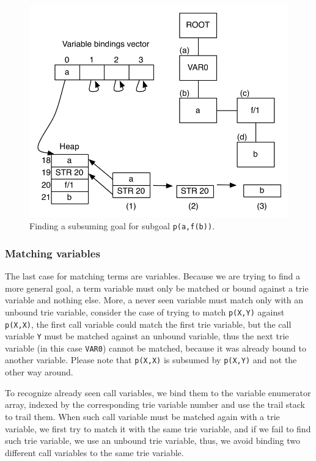 \begin{figure}[ht]
  \centering
    \includegraphics[scale=0.6]{match_functor.pdf}
  \caption{Finding a subsuming goal for subgoal \texttt{p(a,f(b))}.}
  \label{fig:match_functor}
\end{figure}

\subsubsection{Matching variables}

The last case for matching terms are variables. Because we are trying to find a more general goal,
a term variable must only be matched or bound against a trie variable and nothing else. More, a
never seen variable must match only with an unbound trie variable, consider the case of trying to
match \texttt{p(X,Y)} against \texttt{p(X,X)}, the first call variable could match the first trie variable,
but the call variable \texttt{Y} must be matched against an unbound variable, thus the next trie variable
(in this case \texttt{VAR0}) cannot be matched, because it was already bound to another variable.
Please note that \texttt{p(X,X)} is subsumed by \texttt{p(X,Y)} and not the other way around.

To recognize already seen call variables, we bind them to the variable enumerator array, indexed
by the corresponding trie variable number and use the trail stack to trail them.
When such call variable must be matched again with a
trie variable, we first try to match it with the same trie variable, and if we fail to find such trie
variable, we use an unbound trie variable, thus, we avoid binding two different call variables to the same
trie variable.

